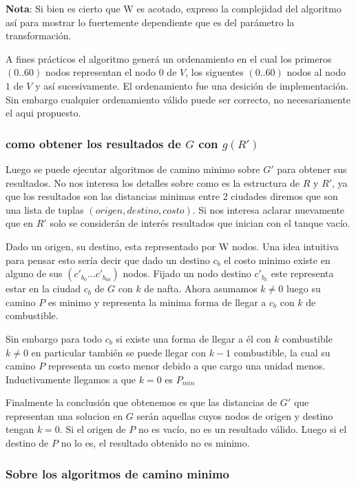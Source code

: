 \documentclass[12pt]{article}
\begin{document}
\textbf{Nota}: Si bien es cierto que W es acotado, expreso la complejidad del algoritmo así para mostrar lo fuertemente dependiente que es del parámetro la transformación. 

A fines prácticos el algoritmo generá un ordenamiento en el cual los primeros $(0..60)$ nodos representan el nodo $0$ de $V$, los siguentes $(0..60)$ nodos al nodo $1$ de $V$ y así sucesivamente. El ordenamiento fue una desición de implementación. Sin embargo cualquier ordenamiento válido puede ser correcto, no necesariamente el aqui propuesto. 



\subsubsection{como obtener los resultados de $G$ con $g(R')$}

Luego se puede ejecutar algoritmos de camino minimo sobre $G'$ para obtener sus resultados. No nos interesa los detalles sobre como es la estructura de $R$ y $R'$, ya que los resultados son las distancias minimas entre 2 ciudades diremos que son una lista de tuplas $(origen, destino, costo)$. Si nos interesa aclarar nuevamente que en $R'$ solo se considerán de interés resultados que inician con el tanque vacío.

Dado un origen, su destino, esta representado por W nodos. Una idea intuitiva para pensar esto sería decir que dado un destino $c_b$ el costo minimo existe en alguno de sus $(c'_{b_0}...c'_{b_{60}})$ nodos. Fijado un nodo destino $c'_{b_k}$ este representa estar en la ciudad $c_b$ de $G$ con $k$ de nafta. Ahora asumamos $k \neq 0$ luego su camino $P$ es minimo y representa la minima forma de llegar a $c_b$ con $k$ de combustible.

Sin embargo para todo $c_b$ si existe una forma de llegar a él con $k$ combustible $k \neq 0$ en particular también se puede llegar con $k-1$ combustible, la cual su camino $P$ representa un costo menor debido a que cargo una unidad menos. Inductivamente llegamos a que $k=0$ es $P_{min}$

Finalmente la conclusión que obtenemos es que las distancias de $G'$ que representan una solucion en $G$ serán aquellas cuyos nodos de origen y destino tengan $k = 0$. Si el origen de $P$ no es vacío, no es un resultado válido. Luego si el destino de $P$ no lo es, el resultado obtenido no es minimo.

\subsubsection{Sobre los algoritmos de camino minimo}
\end{document}
